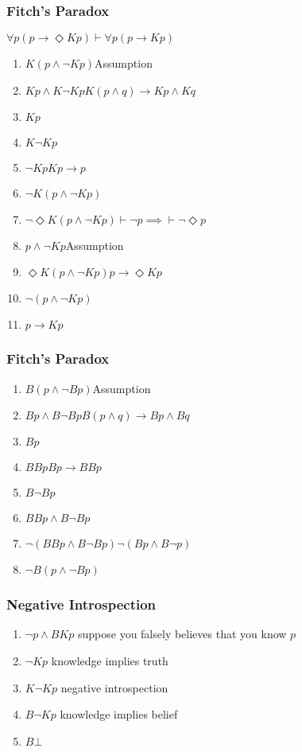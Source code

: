 \documentclass[UTF8,aspectratio=43,11pt,colorlinks,compress,openany]{beamer}%
\begin{document}
\begin{frame}\frametitle{Fitch's Paradox}\centering{}
	\begin{block}{$\forall p(p\to\Diamond Kp)\vdash\forall p(p\to Kp)$}
		\begin{enumerate}
			\item $K(p\wedge\neg Kp)$\hfill Assumption
			\item $Kp\wedge K\neg Kp$\hfill $K(p\wedge q)\to Kp\wedge Kq$
			\item $Kp$
			\item $K\neg Kp$
			\item $\neg Kp$\hfill $Kp\to p$
			\item $\neg K(p\wedge\neg Kp)$
			\item $\neg\Diamond K(p\wedge\neg Kp)$\hfill $\vdash\neg p\implies\vdash\neg\Diamond p$
			\item $p\wedge\neg Kp$\hfill Assumption
			\item $\Diamond K(p\wedge\neg Kp)$\hfill $p\to\Diamond Kp$
			\item $\neg(p\wedge\neg Kp)$
			\item $p\to Kp$
		\end{enumerate}
	\end{block}
\end{frame}

\begin{frame}\frametitle{Fitch's Paradox}
	\begin{block}{}
		\begin{enumerate}
			\item $B(p\wedge\neg Bp)$\hfill Assumption
			\item $Bp\wedge B\neg Bp$\hfill $B(p\wedge q)\to Bp\wedge Bq$
			\item $Bp$
			\item $BBp$\hfill $Bp\to BBp$
			\item $B\neg Bp$
			\item $BBp\wedge B\neg Bp$
			\item $\neg(BBp\wedge B\neg Bp)$\hfill $\neg(Bp\wedge B\neg p)$
			\item $\neg B(p\wedge\neg Bp)$
		\end{enumerate}
	\end{block}
\end{frame}

\begin{frame}\frametitle{Negative Introspection}
\begin{enumerate}
	\item $\neg p\wedge BKp$ \hfill suppose you falsely believes that you know $p$
	\item $\neg Kp$ \hfill knowledge implies truth
	\item $K\neg Kp$ \hfill negative introspection
	\item $B\neg Kp$ \hfill knowledge implies belief
	\item $B\bot$
\end{enumerate}
\end{frame}
\end{document}
